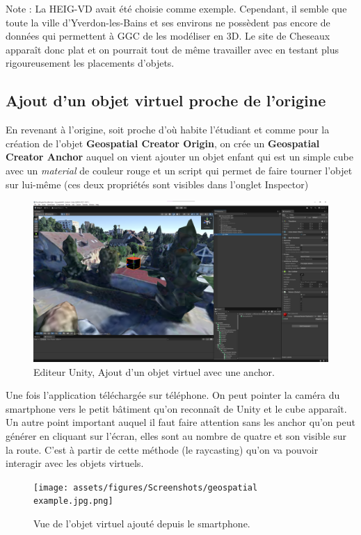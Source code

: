 Note : La HEIG-VD avait été choisie comme exemple. Cependant, il semble que toute la ville d'Yverdon-les-Bains et ses environs ne possèdent pas encore
de données qui permettent à GGC de les modéliser en 3D. Le site de Cheseaux apparaît donc plat et on pourrait tout de même travailler avec
en testant plus rigoureusement les placements d'objets.

\subsection{Ajout d'un objet virtuel proche de l'origine}
En revenant à l'origine, soit proche d'où habite l'étudiant et comme pour la création de l'objet \textbf{Geospatial Creator Origin}, on crée un \textbf{Geospatial Creator Anchor} auquel on vient ajouter un objet enfant
qui est un simple cube avec un \textit{material} de couleur rouge et un script  qui permet de faire tourner l'objet sur lui-même (ces deux propriétés sont visibles dans l'onglet Inspector)

\begin{figure}[H]
    \centering
    \includegraphics[width=1\linewidth]{assets/figures/Screenshots/GGC_3.png}
    \caption{Editeur Unity, Ajout d'un objet virtuel avec une anchor.}
    \label{fig:GGC_3}
\end{figure}
Une fois l'application téléchargée sur téléphone. On peut pointer la caméra du smartphone vers le petit bâtiment qu'on reconnaît de Unity et le cube apparaît.
Un autre point important auquel il faut faire attention sans les anchor qu'on peut générer en cliquant sur l'écran, elles sont au nombre de quatre et son visible sur la route. C'est à partir de cette méthode (le raycasting)
qu'on va pouvoir interagir avec les objets virtuels.

\begin{figure}[H]
    \centering
    \texttt{[image: assets/figures/Screenshots/geospatial example.jpg.png]}
    \caption{Vue de l'objet virtuel ajouté depuis le smartphone.}
    \label{fig:GeoSample}
\end{figure}

